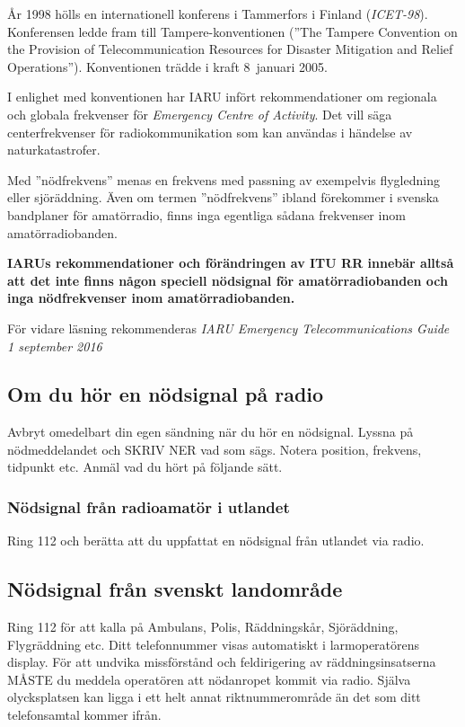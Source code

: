 År 1998 hölls en internationell konferens i Tammerfors i Finland (\emph{ICET-98}).
Konferensen ledde fram till Tampere-konventionen (''The Tampere Convention on
the Provision of Telecommunication Resources for Disaster Mitigation and Relief
Operations''). Konventionen trädde i kraft 8~januari 2005.

I enlighet med konventionen har IARU infört rekommendationer om regionala och globala frekvenser för \emph{Emergency Centre of Activity}.
Det vill säga centerfrekvenser för radiokommunikation som kan användas i händelse av naturkatastrofer.

Med ''nödfrekvens'' menas en frekvens med passning av exempelvis flygledning eller sjöräddning. Även om termen ''nödfrekvens'' ibland förekommer i svenska bandplaner för amatörradio, finns inga egentliga sådana frekvenser inom amatörradiobanden.

\textbf{IARUs rekommendationer och förändringen av ITU RR innebär alltså att det inte
	finns någon speciell nödsignal för amatörradiobanden och inga nödfrekvenser
	inom amatörradiobanden.}

För vidare läsning rekommenderas
\emph{IARU Emergency Telecommunications Guide 1 september 2016}

\subsection{Om du hör en nödsignal på radio}

Avbryt omedelbart din egen sändning när du hör en nödsignal. Lyssna på
nödmeddelandet och SKRIV NER vad som sägs. Notera position, frekvens, tidpunkt
etc. Anmäl vad du hört på följande sätt.

\subsubsection{Nödsignal från radioamatör i utlandet}

Ring 112 och berätta att du uppfattat en nödsignal från utlandet via radio.

\subsection{Nödsignal från svenskt landområde}

Ring 112 för att kalla på Ambulans, Polis, Räddningskår, Sjöräddning,
Flygräddning etc. Ditt telefonnummer visas automatiskt i larmoperatörens
display. För att undvika missförstånd och feldirigering av
räddningsinsatserna MÅSTE du meddela operatören att nödanropet kommit via radio.
Själva olycksplatsen kan ligga i ett helt annat riktnummerområde än det som ditt
telefonsamtal kommer ifrån.

